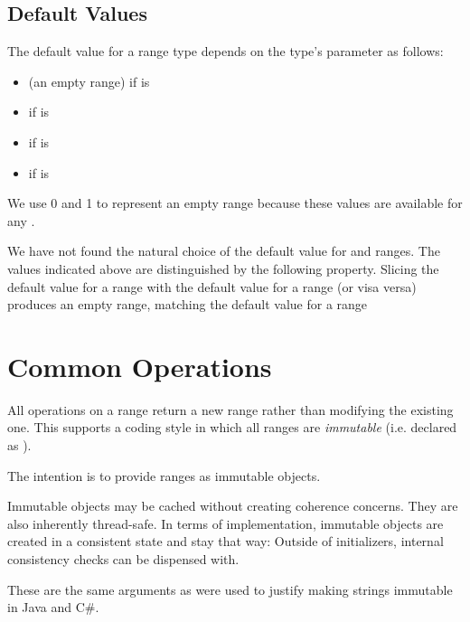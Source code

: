 \subsection{Default Values}
\label{Range_Default_Values}

The default value for a range type depends on the type's
 parameter as follows:

\begin{itemize}

\item {} (an empty range) if  is 

\item {} if  is 

\item {} if  is 

\item {} if  is 

\end{itemize}

\begin{rationale}
We use 0 and 1 to represent an empty range because these values
are available for any .

We have not found the natural choice of the default value for
 and  ranges.
The values indicated above are distinguished by the following property.
Slicing the default value for a  range with
the default value for a  range (or visa versa)
produces an empty range, matching the default value for a
 range
\end{rationale}


\section{Common Operations}
\label{Ranges_Common_Operations}

All operations on a range return a new range rather than modifying the existing one.  This
supports a coding style in which all ranges are \emph{immutable} (i.e. declared
as ).  

\begin{rationale}

The intention is to provide ranges as immutable objects.

Immutable objects may be cached without
creating coherence concerns.  They are also inherently thread-safe.  In terms of
implementation, immutable objects are created in a consistent state and stay that way:
Outside of initializers, internal consistency checks can be dispensed with.

These are the same arguments as were used to justify making strings immutable in Java and C\#.

\end{rationale}

